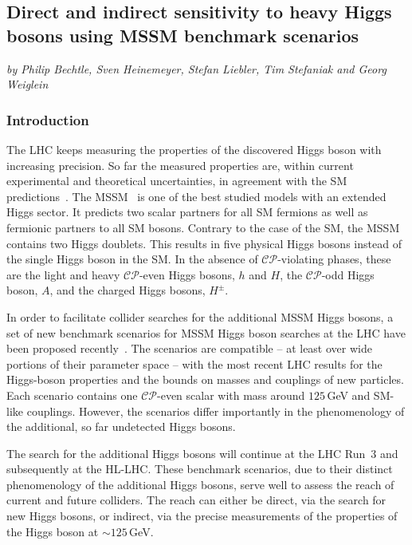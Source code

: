 \subsection{Direct and indirect sensitivity to heavy Higgs bosons using MSSM benchmark scenarios}
\begin{center}
\textit{by Philip Bechtle, Sven Heinemeyer, Stefan Liebler, Tim Stefaniak and Georg Weiglein}
\end{center}

\subsubsection{Introduction}

The LHC keeps measuring the properties of the discovered Higgs boson with increasing precision. So far the measured properties are, within current experimental and theoretical uncertainties, in agreement with the SM predictions~\cite{Khachatryan:2016vau}. The MSSM~\cite{Nilles:1983ge,Haber:1984rc,Gunion:1984yn} is one of the best studied models with an extended Higgs sector. It predicts two scalar partners for all SM fermions as well as fermionic partners to all SM bosons. Contrary to the case of the SM, the MSSM contains two Higgs doublets.
This results in five physical Higgs bosons instead of the single Higgs boson in the SM. In the absence of $\mathcal{CP}$-violating phases, these are the light and heavy $\mathcal{CP}$-even Higgs bosons,  
$h$ and $H$, the $\mathcal{CP}$-odd Higgs boson, $A$, and the charged Higgs bosons, $H^\pm$.

In order to facilitate collider searches for the additional MSSM Higgs bosons, a set of new benchmark scenarios for MSSM Higgs boson searches at the LHC have been proposed recently~\cite{Bahl:2018zmf}. The scenarios are compatible -- at least over wide portions
of their parameter space -- with the most recent LHC results for the
Higgs-boson properties and the bounds on masses and couplings of new
particles. Each scenario contains one $\mathcal{CP}$-even scalar with mass around $125$\,GeV and SM-like couplings. However, the scenarios differ importantly in the phenomenology of the additional, so far undetected Higgs bosons.

The search for the additional Higgs bosons will continue at the LHC
Run~3 and subsequently at the HL-LHC. These benchmark scenarios, due to their distinct phenomenology of the additional Higgs bosons, serve well to assess the reach of current and future colliders. The reach can either be direct, via the search for new Higgs bosons, or indirect, via the precise measurements of the properties of the Higgs boson at $\sim 125$\,GeV. 

